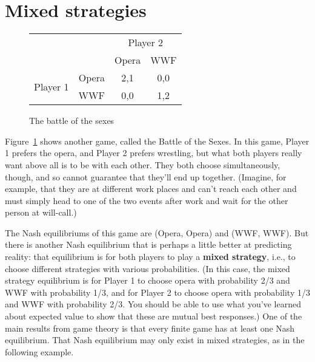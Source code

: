 \section{Mixed strategies}

\begin{figure}[b]
\begin{center}
\begin{tabular}{crcc}
& & \multicolumn{2}{c}{Player 2} \\ [.15cm]
& & Opera & WWF \\ \cline{3-4}
\multirow{2}{1.5cm}{Player 1} & Opera & \multicolumn{1}{|c|}{2,1} & \multicolumn{1}{c|}{0,0} \\ \cline{3-4}
                   & WWF & \multicolumn{1}{|c|}{0,0} & \multicolumn{1}{c|}{1,2} \\ \cline{3-4}
\end{tabular}
\end{center}
\caption{The battle of the sexes}
\label{game_battleofsexes} %
\end{figure}


Figure~\ref{game_battleofsexes} shows another game, called the Battle of the Sexes. In this game, Player 1 prefers the opera, and Player 2 prefers wrestling, but what both players really want above all is to be with each other. They both choose simultaneously, though, and so cannot guarantee that they'll end up together. (Imagine, for example, that they are at different work places and can't reach each other and must simply head to one of the two events after work and wait for the other person at will-call.)

The Nash equilibriums of this game are (Opera, Opera) and (WWF, WWF). But there is another Nash equilibrium that is perhaps a little better at predicting reality: that equilibrium is for both players to play a \textbf{mixed strategy}, i.e., to choose different strategies with various probabilities. (In this case, the mixed strategy equilibrium is for Player 1 to choose opera with probability 2/3 and WWF with probability 1/3, and for Player 2 to choose opera with probability 1/3 and WWF with probability 2/3. You should be able to use what you've learned about expected value to show that these are mutual best responses.) One of the main results from game theory is that every finite game has at least one Nash equilibrium. That Nash equilibrium may only exist in mixed strategies, as in the following example.


